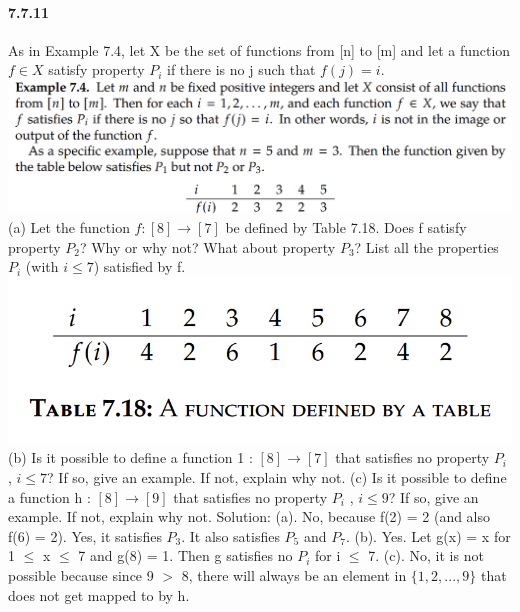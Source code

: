 \documentclass{article}
\begin{document}
\paragraph{7.7.11}
As in Example 7.4, let X be the set of functions from [n] to [m] and let a function
$f \in X$ satisfy property $P_i$
if there is no j such that $f (j) = i$.\newline
\includegraphics{Example7.4}\newline
(a) Let the function $f : [8] \to [7]$ be defined by Table 7.18. Does f satisfy property
$P_2$? Why or why not? What about property $P_3$? List all the properties $P_i$ (with
$i \leq 7$) satisfied by f.\newline
\includegraphics{Table7.18}\newline
(b) Is it possible to define a function 1 : $[8] \to [7]$ that satisfies no property $P_i$
, $i \leq 7$?
If so, give an example. If not, explain why not.\newline
(c) Is it possible to define a function h : $[8] \to [9]$ that satisfies no property $P_i$
, $i \leq 9$?
If so, give an example. If not, explain why not.\newline
Solution:\newline
(a). No, because f(2) = 2 (and also f(6) = 2). Yes, it satisfies $P_3$. It also satisfies $P_5$ and $P_7$.\newline
(b). Yes. Let g(x) = x for 1 $\leq$ x $\leq$ 7 and g(8) = 1. Then g satisfies no $P_i$
for i $\leq$ 7.
(c). No, it is not possible because since 9 $>$ 8, there will always be an element in $\{1, 2, . . . , 9\}$
that does not get mapped to by h.
\end{document}
